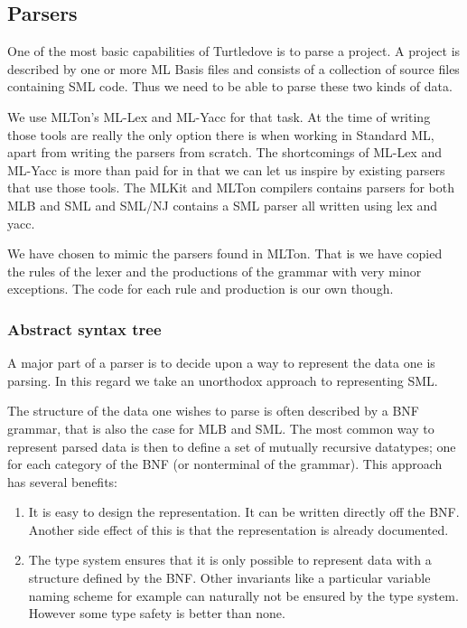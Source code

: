 \subsection{Parsers}
\label{sec:design-parsers}

One of the most basic capabilities of Turtledove is to parse a project. A
project is described by one or more ML Basis files and consists of a collection
of source files containing SML code. Thus we need to be able to parse these two
kinds of data.

We use MLTon's ML-Lex and ML-Yacc for that task. At the time of writing those
tools are really the only option there is when working in Standard ML, apart
from writing the parsers from scratch. The shortcomings of ML-Lex and ML-Yacc is
more than paid for in that we can let us inspire by existing parsers that use
those tools. The MLKit and MLTon compilers contains parsers for both MLB and SML
and SML/NJ contains a SML parser all written using lex and yacc.

We have chosen to mimic the parsers found in MLTon. That is we have copied the
rules of the lexer and the productions of the grammar with very minor
exceptions. The code for each rule and production is our own though.

\subsubsection{Abstract syntax tree}

A major part of a parser is to decide upon a way to represent the data one is
parsing. In this regard we take an unorthodox approach to representing SML.

The structure of the data one wishes to parse is often described by a BNF
grammar, that is also the case for MLB and SML. The most common way to represent
parsed data is then to define a set of mutually recursive datatypes; one for
each category of the BNF (or nonterminal of the grammar). This approach has
several benefits:

\begin{enumerate}
\item It is easy to design the representation. It can be written directly off the
      BNF. Another side effect of this is that the representation is already
      documented.
\item The type system ensures that it is only possible to represent data with a
      structure defined by the BNF. Other invariants like a particular variable
      naming scheme for example can naturally not be ensured by the type
      system. However some type safety is better than none.
\end{enumerate}

